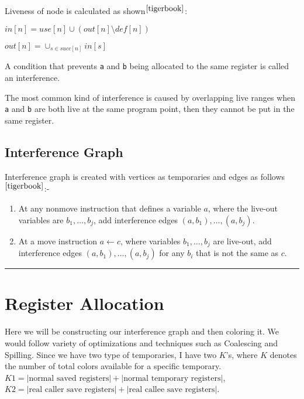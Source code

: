 Liveness of node is calculated as shown$^{\cite{tigerbook}}$:

\(in[n] = use[n] \cup (out[n] \setminus def[n])\)

\(out[n] = \cup_{s \in succ[n]} in[s]\)

A condition that prevents
\texttt{a} and
\texttt{b} being
allocated to the same register is called an interference.

The most common kind of interference is caused by overlapping live
ranges when
\texttt{a} and
\texttt{b} are
both live at the same program point, then they cannot be put in the same
register.

\hypertarget{interference-graph}{%
\subsection{Interference Graph}\label{interference-graph}}

Interference graph is created with vertices as temporaries and edges as
follows$^{\cite{tigerbook}}$:-

\begin{enumerate}
\def\labelenumi{\arabic{enumi}.}
\item
  At any nonmove instruction that defines a variable \(a\), where the
  live-out variables are \(b_1, \dots, b_j\), add interference edges
  \((a, b_1), \dots, (a, b_j)\).
\item
  At a move instruction \(a \leftarrow c\), where variables
  \(b_1, \dots, b_j\) are live-out, add interference edges
  \((a, b_1), \dots, (a, b_j)\) for any \(b_i\) that is not the same as
  \(c\).
\end{enumerate}

\begin{center}\rule{0.5\linewidth}{\linethickness}\end{center}

\section{Register Allocation}


Here we will be constructing our interference graph and then coloring it. We would follow variety of optimizations and techniques such as Coalescing and Spilling. Since we have two type of temporaries, I have two $K$'s, where $K$ denotes the number of total colors available for a specific temporary. $K1 = |\text{normal saved registers}| + |\text{normal temporary registers}|$, $K2 = |\text{real caller save registers}| + |\text{real callee save registers}|$. 

